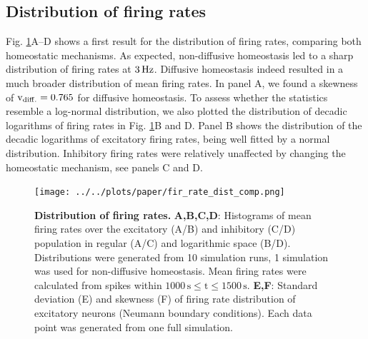 \documentclass[10pt,letterpaper]{article}
\begin{document}
\subsection*{Distribution of firing rates}\label{Fir_Dist_Section}
Fig. \ref{Fir_Rate_Dist_Comp}A--D shows a first result for the distribution of firing rates, comparing both homeostatic mechanisms. As expected, non-diffusive homeostasis led to a sharp distribution of firing rates at $\rm 3\, Hz$. Diffusive homeostasis indeed resulted in a much broader distribution of mean firing rates. In panel A, we found a skewness of $\mathrm{v_{\rm diff.} = 0.765}$ for diffusive homeostasis. To assess whether the statistics resemble a log-normal distribution, we also plotted the distribution of decadic logarithms of firing rates in Fig. \ref{Fir_Rate_Dist_Comp}B and D. Panel B shows the distribution of the decadic logarithms of excitatory firing rates, being well fitted by a normal distribution. Inhibitory firing rates were relatively unaffected by changing the homeostatic mechanism, see panels C and D.  

\begin{figure}
\begin{center}
\texttt{[image: ../../plots/paper/fir\_rate\_dist\_comp.png]}
\end{center}
\caption{{\bf Distribution of firing rates.} \textbf{A,B,C,D}: Histograms of mean firing rates over the excitatory (A/B) and inhibitory (C/D) population in regular (A/C) and logarithmic space (B/D). Distributions were generated from 10 simulation runs, 1 simulation was used for non-diffusive homeostasis. Mean firing rates were calculated from spikes within $\mathrm{1000\,s \leq t \leq 1500\,s}$. \textbf{E,F}: Standard deviation (E) and skewness (F) of firing rate distribution of excitatory neurons (Neumann boundary conditions). Each data point was generated from one full simulation.}
\label{Fir_Rate_Dist_Comp}
\end{figure}
\end{document}
